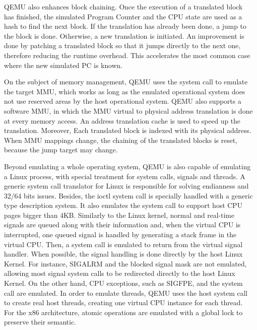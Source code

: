 \documentclass[11pt,twoside]{article}
\begin{document}
  QEMU also enhances block chaining.
  Once the execution of a translated block has finished,
  the simulated
  Program Counter and the CPU state are used as a hash to find the
  next block. If the translation has already been done, a jump to the
  block is done. Otherwise, a new translation is initiated.
  An improvement is done by patching a translated block so that
  it jumps directly to the next one,
  therefore reducing the runtime overhead.
  This accelerates the most common case
  where the new simulated PC is known.

  On the subject of memory management,
  QEMU uses the  system call to emulate the target MMU,
  which works as long as the emulated operational system
  does not use reserved areas by the host operational system.
  QEMU also supports a software MMU,
  in which the MMU virtual to physical
  address translation is done at every memory access. An address
  translation cache is used to speed up the translation. Moreover, 
  Each translated block is indexed with its physical address.
  When MMU
  mappings change, the chaining of the translated blocks is reset,
  because the jump target may change.

  Beyond emulating a whole operating system, QEMU is also capable
  of emulating a Linux process, with 
  special treatment for system calls, signals and threads.
  A generic system call translator for Linux is responsible for
  solving endianness and 32/64 bits issues. Besides, the ioctl system
  call is specially handled with a generic type description system.
  It also emulates the 
  system call to support host CPU pages bigger than 4KB.
  Similarly to the Linux kernel, normal and real-time signals are
  queued along with their information and, when the virtual CPU
  is interrupted, one queued signal is handled by generating a stack
  frame in the virtual CPU. Then, 
  a  system call is emulated
  to return from the virtual signal handler. When possible,
  the signal
  handling is done directly by the host Linux Kernel. For instance,
  SIGALRM and the blocked signal mask are not emulated, allowing most
  signal system calls to be redirected directly to the host Linux
  Kernel. On the other hand, CPU exceptions, such as SIGFPE, and the
   system call are emulated.
  In order to emulate threads, QEMU uses the host 
  system call to create real host threads, creating one virtual CPU
  instance for each thread. For the x86 architecture, atomic 
  operations are emulated with a global 
  lock to preserve their semantic.
\end{document}
